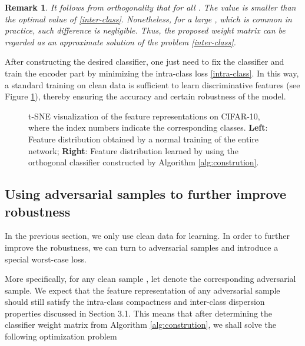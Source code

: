 \documentclass[preprint,review,12pt]{elsarticle}
\newtheorem{rmrk}{Remark}
\numberwithin{equation}{section}
\begin{document}
\begin{rmrk}
        It follows from orthogonality that   for all  .
		The value  is smaller than the optimal value   of  \eqref{inter-class}.
        Nonetheless,  for a large , which is common in practice, such difference is negligible.
		Thus, the proposed weight matrix can be regarded as an approximate solution of the problem \eqref{inter-class}.
\end{rmrk}
	
After constructing the desired classifier,	
one just need to fix the classifier and train the encoder part by minimizing the intra-class loss \eqref{intra-class}.
In this way, a standard training on clean data is sufficient to learn discriminative features (see Figure \ref{features}),
thereby ensuring the accuracy and certain robustness of the model.

	\begin{figure}[!htb]
		\centering
		\begin{minipage}{0.45\textwidth}
			\centering
		\end{minipage}
		\begin{minipage}{0.45\textwidth}
			\centering
		\end{minipage}
		\caption{t-SNE \cite{maaten2008} visualization of the feature representations on CIFAR-10, where the index numbers indicate the corresponding classes.
			\textbf{Left}:   Feature distribution obtained by a normal training of the entire network;
			\textbf{Right}: Feature distribution learned by using the orthogonal classifier constructed by Algorithm \ref{alg:constrution}.}
		\label{features}
	\end{figure}



\subsection{Using adversarial samples to further improve robustness}
In the previous section,
we only use clean data for learning.
In order to further improve the robustness,
we can turn to adversarial samples  \cite{madry2018,zhang2019b} and introduce  a special worst-case loss.

More specifically, for any clean sample , let  denote the corresponding adversarial sample.
We expect that the feature representation of any adversarial sample should still satisfy
the intra-class compactness and inter-class dispersion  properties discussed in Section 3.1.
This means that  after  determining the classifier weight matrix   from Algorithm \ref{alg:constrution},
we shall solve the following optimization problem
\end{document}
